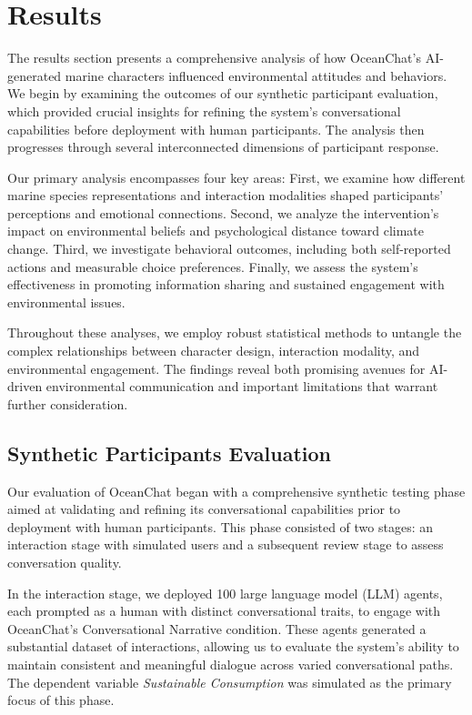 \documentclass[sigconf, nonacm]{acmart}
\begin{document}
\section{Results}
The results section presents a comprehensive analysis of how OceanChat's AI-generated marine characters influenced environmental attitudes and behaviors. We begin by examining the outcomes of our synthetic participant evaluation, which provided crucial insights for refining the system's conversational capabilities before deployment with human participants. The analysis then progresses through several interconnected dimensions of participant response.

Our primary analysis encompasses four key areas: First, we examine how different marine species representations and interaction modalities shaped participants' perceptions and emotional connections. Second, we analyze the intervention's impact on environmental beliefs and psychological distance toward climate change. Third, we investigate behavioral outcomes, including both self-reported actions and measurable choice preferences. Finally, we assess the system's effectiveness in promoting information sharing and sustained engagement with environmental issues.

Throughout these analyses, we employ robust statistical methods to untangle the complex relationships between character design, interaction modality, and environmental engagement. The findings reveal both promising avenues for AI-driven environmental communication and important limitations that warrant further consideration. 

\subsection{Synthetic Participants Evaluation}
Our evaluation of OceanChat began with a comprehensive synthetic testing phase aimed at validating and refining its conversational capabilities prior to deployment with human participants. This phase consisted of two stages: an interaction stage with simulated users and a subsequent review stage to assess conversation quality.

In the interaction stage, we deployed 100 large language model (LLM) agents, each prompted as a human with distinct conversational traits, to engage with OceanChat’s Conversational Narrative condition. These agents generated a substantial dataset of interactions, allowing us to evaluate the system’s ability to maintain consistent and meaningful dialogue across varied conversational paths. The dependent variable \textit{Sustainable Consumption} was simulated as the primary focus of this phase.
\end{document}
